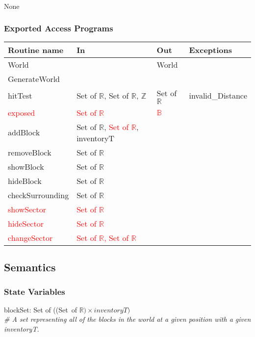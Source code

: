 \documentclass[12pt]{article}
\begin{document}
None

\subsubsection* {Exported Access Programs}

\begin{tabular}{| l | l | l | p{3.5cm} |}
\hline
\textbf{Routine name} & \textbf{In} & \textbf{Out} & \textbf{Exceptions}\\
\hline
World & ~ & World & ~\\
\hline
GenerateWorld & ~ & ~ & ~\\
\hline
hitTest & Set of $\mathbb{R}$, Set of $\mathbb{R}$, $\mathbb{Z}$ & Set of $\mathbb{R}$ & invalid\_Distance\\
\hline
\textcolor{red}{exposed} & \textcolor{red}{Set of $\mathbb{R}$} & \textcolor{red}{$\mathbb{B}$} & \\
\hline
addBlock & Set of $\mathbb{R}$, \textcolor{red}{Set of $\mathbb{R}$}, inventoryT & ~ & ~ \\
\hline
removeBlock & Set of $\mathbb{R}$ & ~ & ~\\
\hline
showBlock & Set of $\mathbb{R}$ & ~ & \\
\hline
hideBlock & Set of $\mathbb{R}$ & ~ & \\
\hline
checkSurrounding & Set of $\mathbb{R}$  & ~ & \\
\hline
\textcolor{red}{showSector} & \textcolor{red}{Set of $\mathbb{R}$} & ~ & \\
\hline
\textcolor{red}{hideSector} & \textcolor{red}{Set of $\mathbb{R}$}  & ~ & \\
\hline
\textcolor{red}{changeSector} & \textcolor{red}{Set of $\mathbb{R}$, Set of $\mathbb{R}$}  & ~ & \\
\hline

\end{tabular}

\subsection* {Semantics}

\subsubsection* {State Variables}

blockSet: Set of ((\mbox{Set of}  $\mathbb{R}) \times inventoryT)$\\ \textit{\# A set representing all of the blocks in the world at a given position with a given inventoryT.}\\
\end{document}
